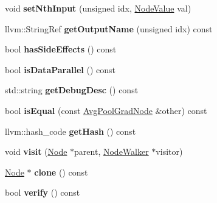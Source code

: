 \begin{DoxyCompactItemize}
\mbox{\label{classglow_1_1_avg_pool_grad_node_a5cea36cee824140e9c06385a2fddfead}} 
void {\bfseries set\+Nth\+Input} (unsigned idx, \hyperlink{structglow_1_1_node_value}{Node\+Value} val)
\item 
\mbox{\label{classglow_1_1_avg_pool_grad_node_a9696e71270105fbd77f5ad8590efb24d}} 
llvm\+::\+String\+Ref {\bfseries get\+Output\+Name} (unsigned idx) const
\item 
\mbox{\label{classglow_1_1_avg_pool_grad_node_ad8af65643c66dff74c2bfbab428faa8e}} 
bool {\bfseries has\+Side\+Effects} () const
\item 
\mbox{\label{classglow_1_1_avg_pool_grad_node_acd9ddf58526680a4f8861330f8cd450d}} 
bool {\bfseries is\+Data\+Parallel} () const
\item 
\mbox{\label{classglow_1_1_avg_pool_grad_node_a957c5f18231ca627753614ca16280a9a}} 
std\+::string {\bfseries get\+Debug\+Desc} () const
\item 
\mbox{\label{classglow_1_1_avg_pool_grad_node_ac3dbd6d5eec20a33d64db44fbc9a46c7}} 
bool {\bfseries is\+Equal} (const \hyperlink{classglow_1_1_avg_pool_grad_node}{Avg\+Pool\+Grad\+Node} \&other) const
\item 
\mbox{\label{classglow_1_1_avg_pool_grad_node_a22feea227381863df11d69a5f97aebff}} 
llvm\+::hash\+\_\+code {\bfseries get\+Hash} () const
\item 
\mbox{\label{classglow_1_1_avg_pool_grad_node_a4448d8af44cdd58fdbc24ad91a827683}} 
void {\bfseries visit} (\hyperlink{classglow_1_1_node}{Node} $\ast$parent, \hyperlink{classglow_1_1_node_walker}{Node\+Walker} $\ast$visitor)
\item 
\mbox{\label{classglow_1_1_avg_pool_grad_node_afc2bd4d5c80c3b147a153840306264a0}} 
\hyperlink{classglow_1_1_node}{Node} $\ast$ {\bfseries clone} () const
\item 
\mbox{\label{classglow_1_1_avg_pool_grad_node_aeb0995d631c0d72893a3691babf6a32f}} 
bool {\bfseries verify} () const
\end{DoxyCompactItemize}
